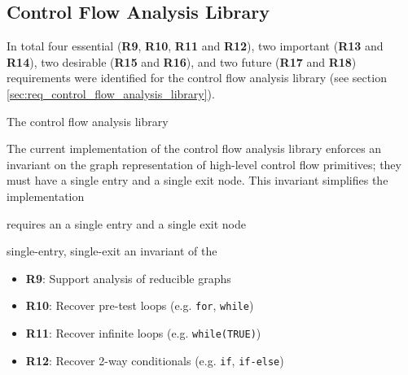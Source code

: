 
\subsection{Control Flow Analysis Library}
\label{sec:eval_control_flow_analysis_library}

In total four essential (\textbf{R9}, \textbf{R10}, \textbf{R11} and \textbf{R12}), two important (\textbf{R13} and \textbf{R14}), two desirable (\textbf{R15} and \textbf{R16}), and two future (\textbf{R17} and \textbf{R18}) requirements were identified for the control flow analysis library (see section \ref{sec:req_control_flow_analysis_library}).

The control flow analysis library


The current implementation of the control flow analysis library enforces an invariant on the graph representation of high-level control flow primitives; they must have a single entry and a single exit node. This invariant simplifies the implementation

requires an a single entry and a single exit node

 single-entry, single-exit an invariant of the

\begin{itemize}
	\item \textbf{R9}: Support analysis of reducible graphs
	\item \textbf{R10}: Recover pre-test loops (e.g. \texttt{for}, \texttt{while})
	\item \textbf{R11}: Recover infinite loops (e.g. \texttt{while(TRUE)})
	\item \textbf{R12}: Recover 2-way conditionals (e.g. \texttt{if}, \texttt{if-else})
\end{itemize}
